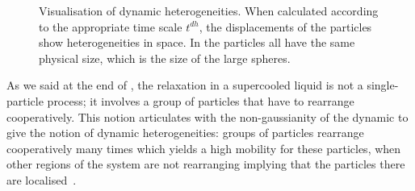 \begin{figure}
	\centering
	\caption{Visualisation of dynamic heterogeneities. When calculated according to the appropriate time scale $t^{dh}$, the displacements of the particles show heterogeneities in space. In  the particles all have the same physical size, which is the size of the large spheres.}
	\label{fig:dynhet}
\end{figure}

As we said at the end of , the relaxation in a supercooled liquid is not a single-particle process; it involves a group of particles that have to rearrange cooperatively. This notion articulates with the non-gaussianity of the dynamic to give the notion of dynamic heterogeneities: groups of particles rearrange cooperatively many times which yields a high mobility for these particles, when other regions of the system are not rearranging implying that the particles there are localised~\citep{Kob1997, Donati1998, Donati1999, kegel2000swe, Perera1999, weeks2000, weeks2002pcr}.

